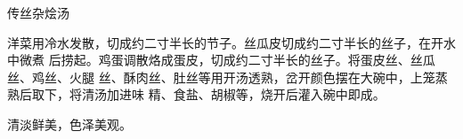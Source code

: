 \begin{recipe}{传丝杂烩汤}

\ingredients


\preparation

洋菜用冷水发散，切成约二寸半长的节子。丝瓜皮切成约二寸半长的丝子，在开水中微煮
后捞起。鸡蛋调散烙成蛋皮，切成约二寸半长的丝子。将蛋皮丝、丝瓜丝、鸡丝、火腿
丝、酥肉丝、肚丝等用开汤透熟，岔开颜色摆在大碗中，上笼蒸熟后取下，将清汤加进味
精、食盐、胡椒等，烧开后灌入碗中即成。

\features

清淡鲜美，色泽美观。

\end{recipe}

